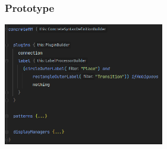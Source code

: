 \begin{frame}
  \frametitle{Prototype}

  \hspace{-1cm}
  \centering
  \includegraphics[width=7cm]{images/config-code}

\end{frame}

